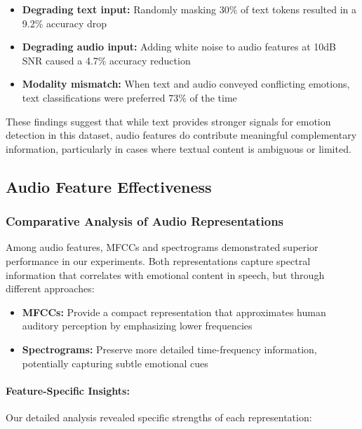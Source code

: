 \documentclass[12pt]{article}
\begin{document}
\begin{itemize}
    \item \textbf{Degrading text input:} Randomly masking 30\% of text tokens resulted in a 9.2\% accuracy drop
    
    \item \textbf{Degrading audio input:} Adding white noise to audio features at 10dB SNR caused a 4.7\% accuracy reduction
    
    \item \textbf{Modality mismatch:} When text and audio conveyed conflicting emotions, text classifications were preferred 73\% of the time
\end{itemize}

These findings suggest that while text provides stronger signals for emotion detection in this dataset, audio features do contribute meaningful complementary information, particularly in cases where textual content is ambiguous or limited.

\subsection{Audio Feature Effectiveness}
\subsubsection{Comparative Analysis of Audio Representations}
Among audio features, MFCCs and spectrograms demonstrated superior performance in our experiments. Both representations capture spectral information that correlates with emotional content in speech, but through different approaches:

\begin{itemize}
    \item \textbf{MFCCs:} Provide a compact representation that approximates human auditory perception by emphasizing lower frequencies
    
    \item \textbf{Spectrograms:} Preserve more detailed time-frequency information, potentially capturing subtle emotional cues
\end{itemize}

\paragraph{Feature-Specific Insights:}
Our detailed analysis revealed specific strengths of each representation:
\end{document}
